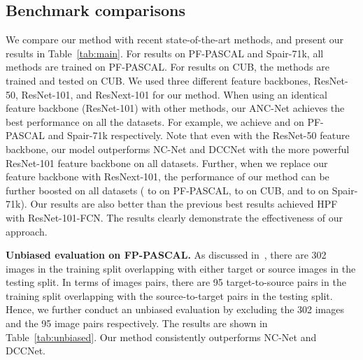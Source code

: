 \documentclass[10pt,twocolumn,letterpaper]{article}
\begin{document}
\subsection{Benchmark comparisons}
We compare our method with recent state-of-the-art methods, and present our results in Table~\ref{tab:main}.
For results on PF-PASCAL and Spair-71k, all methods are trained on PF-PASCAL.
For results on CUB, the methods are trained and tested on CUB. 
We used three different feature backbones, \ie ResNet-50, ResNet-101, and ResNext-101 for our method.
When using an identical feature backbone (ResNet-101) with other methods, our ANC-Net achieves the best performance on all the datasets.
For example, we achieve  and  on PF-PASCAL and Spair-71k respectively.
Note that even with the ResNet-50 feature backbone, our model outperforms NC-Net and DCCNet with the more powerful ResNet-101 feature backbone on all datasets.
Further, when we replace our feature backbone with ResNext-101, the performance of our method can be further boosted on all datasets ( to  on PF-PASCAL,  to  on CUB, and  to  on Spair-71k). Our results are also better than the previous best results achieved HPF with ResNet-101-FCN.
The results clearly demonstrate the effectiveness of our approach. 


\noindent\textbf{Unbiased evaluation on FP-PASCAL.}
As discussed in~\cite{Lee2019SFNet}, there are 302 images in the training split overlapping with either target or source images in the testing split. In terms of images pairs, there are 95 target-to-source pairs in the training split overlapping with the source-to-target pairs in the testing split. Hence, we further conduct an unbiased evaluation by excluding the 302 images and the 95 image pairs respectively. The results are shown in Table~\ref{tab:unbiased}. Our method consistently outperforms NC-Net and DCCNet.

\begin{table}[htb]
\centering
\caption{\textbf{Unbiased evaluation on PF-PASCAL.}}
\label{tab:unbiased}
\end{table}
\end{document}
